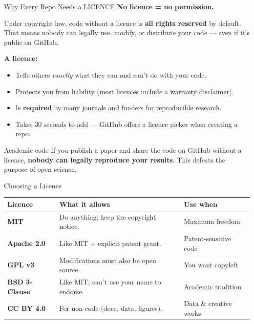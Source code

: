 \documentclass[aspectratio=169, 11pt]{beamer}
\begin{document}
\begin{frame}{Why Every Repo Needs a LICENCE}
  \textbf{No licence = no permission.}

  \vspace{0.3em}
  Under copyright law, code without a licence is \textbf{all rights reserved} by default. That means nobody can legally use, modify, or distribute your code --- even if it's public on GitHub.

  \vspace{0.5em}
  \textbf{A licence:}
  \begin{itemize}
    \item Tells others \emph{exactly} what they can and can't do with your code.
    \item Protects you from liability (most licences include a warranty disclaimer).
    \item Is \textbf{required} by many journals and funders for reproducible research.
    \item Takes 30 seconds to add --- GitHub offers a licence picker when creating a repo.
  \end{itemize}

  \vspace{0.5em}
  \begin{alertblock}{Academic code}
    If you publish a paper and share the code on GitHub without a licence, \textbf{nobody can legally reproduce your results}. This defeats the purpose of open science.
  \end{alertblock}
\end{frame}

\begin{frame}{Choosing a Licence}
  \begin{table}
    \centering
    \begin{tabular}{@{} l p{5.5cm} l @{}}
      \toprule
      \textbf{Licence} & \textbf{What it allows} & \textbf{Use when} \\
      \midrule
      \textbf{MIT} &
        Do anything; keep the copyright notice. &
        Maximum freedom \\
      \textbf{Apache 2.0} &
        Like MIT + explicit patent grant. &
        Patent-sensitive code \\
      \textbf{GPL v3} &
        Modifications must also be open source. &
        You want copyleft \\
      \textbf{BSD 3-Clause} &
        Like MIT; can't use your name to endorse. &
        Academic tradition \\
      \textbf{CC BY 4.0} &
        For non-code (docs, data, figures). &
        Data \& creative works \\
      \bottomrule
    \end{tabular}
  \end{table}
\end{frame}
\end{document}
